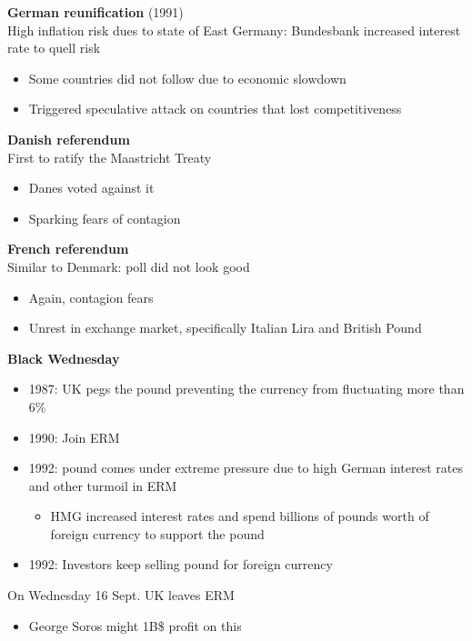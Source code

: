 \documentclass{beamer}
\begin{document}
\begin{frame}
  \textbf{German reunification} (1991)\\
    High inflation risk dues to state of East Germany: Bundesbank increased interest rate to quell risk
    \begin{itemize}
      \item Some countries did not follow due to economic slowdown
      \item Triggered speculative attack on countries that lost competitiveness
    \end{itemize}
\end{frame}

\begin{frame}
 \textbf{Danish referendum}\\
   First to ratify the Maastricht Treaty
   \begin{itemize}
     \item Danes voted against it
     \item Sparking fears of contagion
   \end{itemize}
   \textbf{French referendum}\\
   Similar to Denmark: poll did not look good
   \begin{itemize}
     \item Again, contagion fears
     \item Unrest in exchange market, specifically Italian Lira and British Pound
   \end{itemize}
\end{frame}

\begin{frame}
  \textbf{Black Wednesday}
  \begin{itemize}
    \item 1987: UK pegs the pound preventing the currency from fluctuating more than 6\%
    \item 1990: Join ERM
    \item 1992: pound comes under extreme pressure due to high German interest rates and other turmoil in ERM 
    \begin{itemize}
      \item HMG increased interest rates and spend billions of pounds worth of foreign currency to support the pound
    \end{itemize}
    \item 1992: Investors keep selling pound for foreign currency
  \end{itemize}
  \medskip
  On Wednesday 16 Sept. UK leaves ERM
  \begin{itemize}
    \item George Soros might 1B\$ profit on this
  \end{itemize}
\end{frame}
\end{document}
